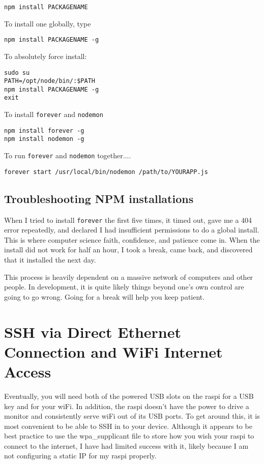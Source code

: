 \begin{lstlisting}
npm install PACKAGENAME
\end{lstlisting}

To install one globally, type
\begin{lstlisting}
npm install PACKAGENAME -g
\end{lstlisting}


To absolutely force install:
\begin{lstlisting}
sudo su
PATH=/opt/node/bin/:$PATH
npm install PACKAGENAME -g
exit
\end{lstlisting}

To install \texttt{forever} and \texttt{nodemon}
\begin{lstlisting}
npm install forever -g
npm install nodemon -g
\end{lstlisting}

To run \texttt{forever} and \texttt{nodemon} together....
\begin{lstlisting}
forever start /usr/local/bin/nodemon /path/to/YOURAPP.js
\end{lstlisting}

\subsection{Troubleshooting NPM installations}
When I tried to install \texttt{forever} the first five times, it timed out, gave me a 404 error repeatedly, and declared I had insufficient permissions to do a global install. This is where computer science faith, confidence, and patience come in. When the install did not work for half an hour, I took a break, came back, and discovered that it installed the next day.

This process is heavily dependent on a massive network of computers and other people. In development, it is quite likely things beyond one's own control are going to go wrong. Going for a break will help you keep patient.

\section{SSH via Direct Ethernet Connection and WiFi Internet Access}
Eventually, you will need both of the powered USB slots on the raspi for a USB key and for your wiFi. In addition, the raspi doesn't have the power to drive a monitor and consistently serve wiFi out of its USB ports. To get around this, it is most convenient to be able to SSH in to your device. Although it appears to be best practice to use the wpa_supplicant file to store how you wish your raspi to connect to the internet, I have had limited success with it, likely because I am not configuring a static IP for my raspi properly.

